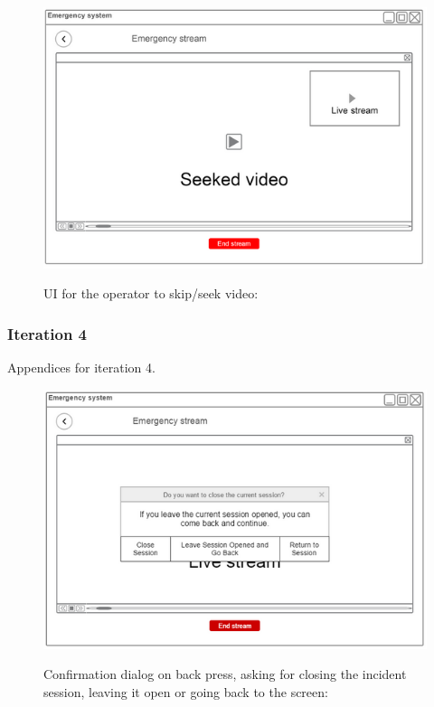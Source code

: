 \documentclass{article}
\begin{document}
    
	
	\begin{figure}[h]
		\centering
	\vspace{-10pt}
		\includegraphics[width=.8\textwidth]{"VideoStream/18"}

		UI for the operator to skip/seek video:
	\vspace{-60pt}
	\end{figure} \clearpage

    \subsubsection{Iteration 4} Appendices for iteration 4.    
	
	\begin{figure}[h]
		\centering
		\includegraphics[width=.8\textwidth]{"VideoStream/19"}

		Confirmation dialog on back press, asking for closing the incident session, leaving it open or going back to the screen:
	\vspace{-5pt}
	\end{figure}
    
\end{document}
